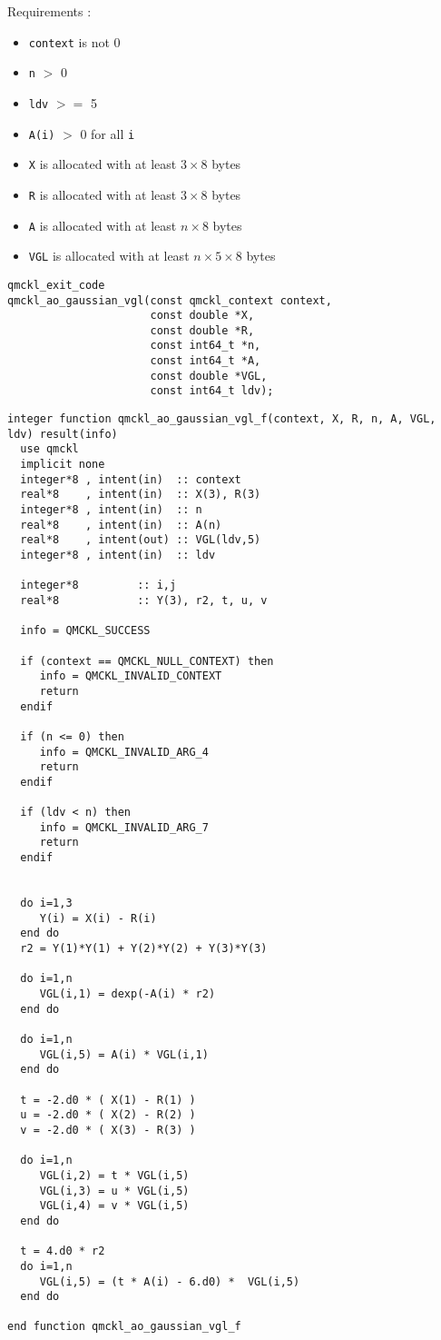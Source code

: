 Requirements :

\begin{itemize}
\item \texttt{context} is not 0
\item \texttt{n} $>$ 0
\item \texttt{ldv} $>=$ 5
\item \texttt{A(i)} $>$ 0 for all \texttt{i}
\item \texttt{X} is allocated with at least \(3 \times 8\) bytes
\item \texttt{R} is allocated with at least \(3 \times 8\) bytes
\item \texttt{A} is allocated with at least \(n \times 8\) bytes
\item \texttt{VGL} is allocated with at least \(n \times 5 \times 8\) bytes
\end{itemize}

\begin{verbatim}
qmckl_exit_code
qmckl_ao_gaussian_vgl(const qmckl_context context,
                      const double *X,
                      const double *R,
                      const int64_t *n,
                      const int64_t *A,
                      const double *VGL,
                      const int64_t ldv);
\end{verbatim}

\begin{verbatim}
integer function qmckl_ao_gaussian_vgl_f(context, X, R, n, A, VGL, ldv) result(info)
  use qmckl
  implicit none
  integer*8 , intent(in)  :: context
  real*8    , intent(in)  :: X(3), R(3)
  integer*8 , intent(in)  :: n
  real*8    , intent(in)  :: A(n)
  real*8    , intent(out) :: VGL(ldv,5)
  integer*8 , intent(in)  :: ldv

  integer*8         :: i,j
  real*8            :: Y(3), r2, t, u, v
  
  info = QMCKL_SUCCESS
  
  if (context == QMCKL_NULL_CONTEXT) then
     info = QMCKL_INVALID_CONTEXT
     return
  endif
  
  if (n <= 0) then
     info = QMCKL_INVALID_ARG_4
     return
  endif
  
  if (ldv < n) then
     info = QMCKL_INVALID_ARG_7
     return
  endif
  
  
  do i=1,3
     Y(i) = X(i) - R(i)
  end do
  r2 = Y(1)*Y(1) + Y(2)*Y(2) + Y(3)*Y(3)
  
  do i=1,n
     VGL(i,1) = dexp(-A(i) * r2)
  end do

  do i=1,n
     VGL(i,5) = A(i) * VGL(i,1)
  end do

  t = -2.d0 * ( X(1) - R(1) )
  u = -2.d0 * ( X(2) - R(2) )
  v = -2.d0 * ( X(3) - R(3) )

  do i=1,n
     VGL(i,2) = t * VGL(i,5)
     VGL(i,3) = u * VGL(i,5)
     VGL(i,4) = v * VGL(i,5)
  end do

  t = 4.d0 * r2
  do i=1,n
     VGL(i,5) = (t * A(i) - 6.d0) *  VGL(i,5)
  end do

end function qmckl_ao_gaussian_vgl_f
\end{verbatim}


